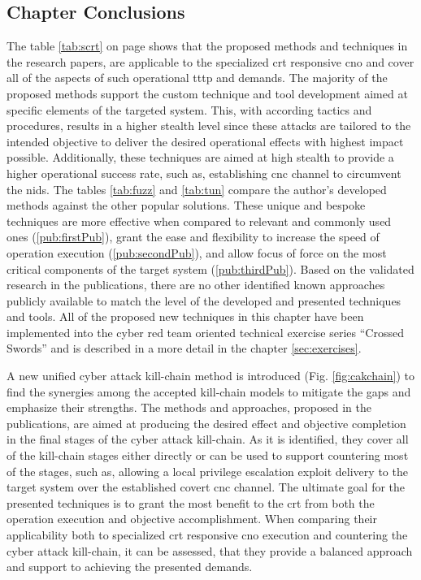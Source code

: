\subsection{Chapter Conclusions}
The table \ref{tab:scrt} on page \pageref{tab:scrt} shows that the proposed methods and techniques in the research papers, are applicable to the specialized \gls{crt} responsive \gls{cno} and cover all of the aspects of such operational \gls{tttp} and demands. The majority of the proposed methods support the custom technique and tool development aimed at specific elements of the targeted system. This, with according tactics and procedures, results in a higher stealth level since these attacks are tailored to the intended objective to deliver the desired operational effects with highest impact possible. Additionally, these techniques are aimed at high stealth to provide a higher operational success rate, such as, establishing \gls{cnc} channel to circumvent the \gls{nids}. The tables \ref{tab:fuzz} and \ref{tab:tun} compare the author's developed methods against the other popular solutions. These unique and bespoke techniques are more effective when compared to relevant and commonly used ones (\ref{pub:firstPub}), grant the ease and flexibility to increase the speed of operation execution (\ref{pub:secondPub}), and allow focus of force on the most critical components of the target system (\ref{pub:thirdPub}). Based on the validated research in the publications, there are no other identified known approaches publicly available to match the level of the developed and presented techniques and tools. All of the proposed new techniques in this chapter have been implemented into the cyber red team oriented technical exercise series ``Crossed Swords'' and is described in a more detail in the chapter \ref{sec:exercises}.

A new unified cyber attack kill-chain method is introduced (Fig. \ref{fig:cakchain}) to find the synergies among the accepted kill-chain models to mitigate the gaps and emphasize their strengths.
The methods and approaches, proposed in the publications, are aimed at producing the desired effect and objective completion in the final stages of the cyber attack kill-chain. As it is identified, they cover all of the kill-chain stages either directly or can be used to support countering most of the stages, such as, allowing a local privilege escalation exploit delivery to the target system over the established covert \gls{cnc} channel.
The ultimate goal for the presented techniques is to grant the most benefit to the \gls{crt} from both the operation execution and objective accomplishment. When comparing their applicability both to specialized \gls{crt} responsive \gls{cno} execution and countering the cyber attack kill-chain, it can be assessed, that they provide a balanced approach and support to achieving the presented demands.

